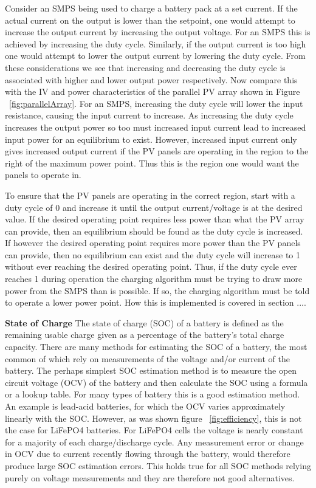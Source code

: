 \documentclass[a4paper]{article}
\begin{document}
Consider an SMPS being used to charge a battery pack at a set current. 
If the actual current on the output is lower than the setpoint, one would attempt
to increase the output current by increasing the output voltage. For an SMPS this
is achieved by increasing the duty cycle. Similarly, if the output current is too
high one would attempt to lower the output current by lowering the duty cycle. From 
these considerations we see that increasing and decreasing the duty cycle is 
associated with higher and lower output power respectively. Now compare this with
the IV and power characteristics of the parallel PV array shown in 
Figure ~\ref{fig:parallelArray}. For an SMPS, increasing the duty cycle 
will lower the input resistance, causing the input current to increase. As increasing
the duty cycle increases the output power so too must increased input current lead to
increased input power for an equilibrium to exist. However, increased input current
only gives increased output current if the PV panels are operating in the region to the right of the
maximum power point. Thus this is the region one would want the panels to operate in.

To ensure that the PV panels are operating in the correct region, start with a duty
cycle of 0 and increase it until the output current/voltage is at the desired value.
If the desired operating point requires less power than what the PV array can provide,
then an equilibrium should be found as the duty cycle is increased. If however the 
desired operating point requires more power than the PV panels can provide, then no 
equilibrium can exist and the duty cycle will increase to 1 without ever reaching the
desired operating point. Thus, if the duty cycle ever reaches 1 during operation
the charging algorithm must be trying to draw more power from the SMPS than is 
possible. If so, the charging algorithm must be told to operate a lower power point. How this
is implemented is covered in section ....

\textbf{State of Charge}
\vspace{10pt} 
\newline
The state of charge (SOC) of a battery is defined as the remaining usable charge 
given as a percentage of the battery’s total charge capacity\cite{DICKINSON2009452}. There are many 
methods for  estimating the SOC of a battery, the most common of which rely on 
measurements of the voltage and/or current of the battery\cite{DANKO2019186}. The perhaps 
simplest SOC estimation method is to measure the open circuit voltage (OCV) 
of the battery and then calculate the SOC using a formula or a lookup table. 
For many types of battery this is a good estimation method. An example is 
lead-acid batteries, for which the OCV varies approximately linearly with the 
SOC. However, as was shown figure ~\ref{fig:efficiency}, this is not the case 
for LiFePO4 batteries. For LiFePO4 cells the voltage is nearly constant for 
a majority of each charge/discharge cycle. Any measurement error or change in 
OCV due to current recently flowing through the battery, would therefore produce large 
SOC estimation errors. This holds true for all SOC methods relying purely on 
voltage measurements and they are therefore not good alternatives. 
\end{document}
